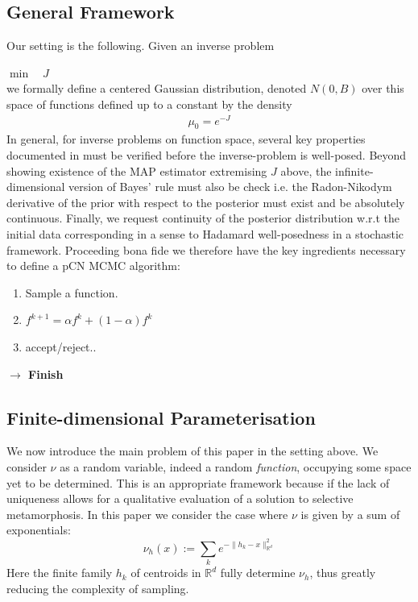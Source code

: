 \documentclass[runningheads]{llncs}
\newcommand{\Rd}{\mathbb{R}^{d}}
\begin{document}
\subsection{General Framework}\label{subs:gf}
Our setting is the following. Given an inverse problem

$\min\quad J$\\

we formally define a centered Gaussian distribution, denoted $N(0, B)$ over this
space of functions defined up to a constant by the density
\begin{align}
\mu_0 = e^{-J}
\end{align}
In general, for inverse problems on function space, several key properties
documented in \cite{?} must be verified before the inverse-problem is
well-posed. Beyond showing existence of the MAP estimator extremising $J$ above,
the infinite-dimensional version of Bayes' rule must also be check i.e. the
Radon-Nikodym derivative of the prior with respect to the posterior must exist
and be absolutely continuous. Finally, we request continuity of the posterior
distribution w.r.t the initial data corresponding in a sense to Hadamard
well-posedness in a stochastic framework. Proceeding bona fide we therefore have
the key ingredients necessary to define a pCN MCMC algorithm:
\begin{enumerate}
\item Sample a function.
\item $f^{k+1} = \alpha f^k + (1-\alpha) f^k$
\item accept/reject..
\end{enumerate}

\textbf{$\longrightarrow$ Finish}\\

\subsection{Finite-dimensional Parameterisation}\label{subs:finite-dim-param}

We now introduce the main problem of this paper in the setting above. We
consider $\nu$ as a random variable, indeed a random \emph{function}, occupying
some space yet to be determined. This is an appropriate framework because if the
lack of uniqueness allows for a qualitative evaluation of a solution to
selective metamorphosis. In this paper we consider the case where $\nu$ is given
by a sum of exponentials:
\begin{equation}
    \nu_h (x) := \sum_k e^{-\|h_k - x\|_{\Rd}^2}
\end{equation}
Here the finite family $h_k$ of centroids in $\Rd$ fully determine $\nu_h$, thus
greatly reducing the complexity of sampling.
\end{document}
